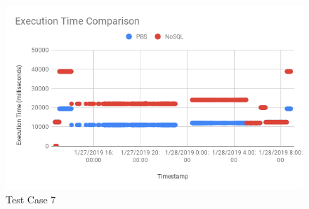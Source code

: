 \begin{figure}
\centering
\includegraphics[scale=0.70]{images/ETC_TC7.png}
\caption{Test Case 7}
\label{fig:etc_tc7}
\end{figure}